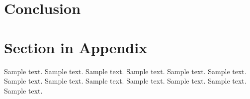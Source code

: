\documentclass[preprint,12pt,3p]{elsarticle}
\begin{document}
\section{Conclusion}
\label{sec:conclusion}

\appendix

\section{Section in Appendix}
\label{appendix-sec1}

	Sample text. Sample text. Sample text. Sample text. Sample text. Sample text. 
	Sample text. Sample text. Sample text. Sample text. Sample text. Sample text. 
	Sample text. 







\end{document}
